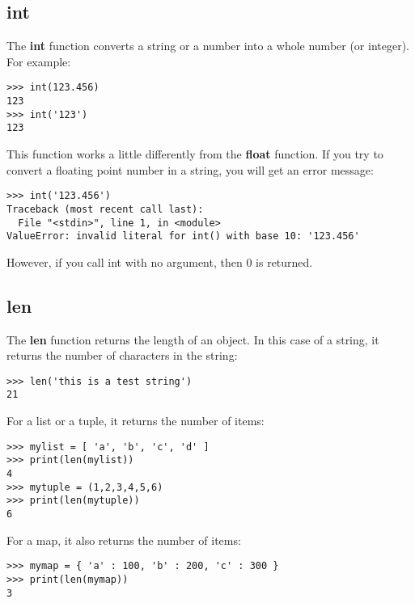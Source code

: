 \subsection*{int}

The \textbf{int} function converts a string or a number into a whole number (or integer). For example:

\begin{Verbatim}[frame=single]
>>> int(123.456)
123
>>> int('123')
123
\end{Verbatim}

This function works a little differently from the \textbf{float} function. If you try to convert a floating point number in a string, you will get an error message:

\begin{Verbatim}[frame=single]
>>> int('123.456')
Traceback (most recent call last):
  File "<stdin>", line 1, in <module>
ValueError: invalid literal for int() with base 10: '123.456'
\end{Verbatim}

\noindent
However, if you call int with no argument, then 0 is returned.

\subsection*{len}

The \textbf{len} function returns the length of an object. In this case of a string, it returns the number of characters in the string:

\begin{Verbatim}[frame=single]
>>> len('this is a test string')
21
\end{Verbatim}

\noindent
For a list or a tuple, it returns the number of items:

\begin{Verbatim}[frame=single]
>>> mylist = [ 'a', 'b', 'c', 'd' ]
>>> print(len(mylist))
4
>>> mytuple = (1,2,3,4,5,6)
>>> print(len(mytuple))
6
\end{Verbatim}

\noindent
For a map, it also returns the number of items:

\begin{Verbatim}[frame=single]
>>> mymap = { 'a' : 100, 'b' : 200, 'c' : 300 }
>>> print(len(mymap))
3
\end{Verbatim}

